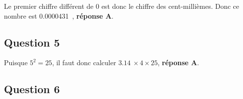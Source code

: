 \documentclass[10pt]{article}
\providecommand{\np}[2][]{{#2~#1}}
\begin{document}
Le premier chiffre différent de $0$ est donc le chiffre des cent-millièmes. Donc ce nombre est \np{0.0000431}, \textbf{réponse A}.
\subsection*{Question 5}



















Puisque \mbox{$5^2=25$}, il faut donc calculer \mbox{$\np{3.14}\times4\times25$}, \textbf{réponse A}.
\subsection*{Question 6}
\end{document}
